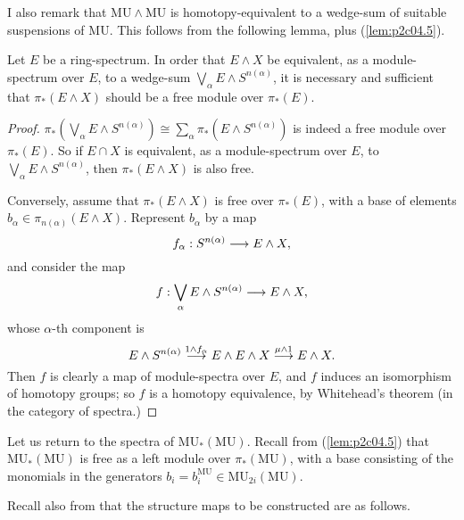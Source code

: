 \documentclass[../main]{subfiles}
\begin{document}
I also remark that $\mathrm{MU} \wedge \mathrm{MU}$ is homotopy-equivalent to a wedge-sum of suitable suspensions of $\mathrm{MU}$. This follows from the following lemma, plus (\ref{lem:p2c04.5}).
\begin{lemma}
\label{lem:p2c11.1}
Let $E$ be a ring-spectrum. In order that $E \wedge X$ be equivalent, as a module-spectrum over $E$, to a wedge-sum $\displaystyle \bigvee_\alpha E \wedge S^{n(\alpha)}$, it is necessary and sufficient that $\pi_\ast(E \wedge X)$ should be a free module over $\pi_\ast(E)$.
\end{lemma}

\begin{proof}
$\displaystyle \pi_\ast \left(\bigvee_\alpha E \wedge S^{n(\alpha)}\right) \cong \sum_\alpha \pi_\ast(E \wedge S^{n(\alpha)})$ is indeed a free module over $\pi_\ast(E)$. So if $E \cap X$ is equivalent, as a module-spectrum over $E$, to $\displaystyle \bigvee_\alpha E \wedge S^{n(\alpha)}$, then $\pi_\ast(E \wedge X)$ is also free.

Conversely, assume that $\pi_\ast(E \wedge X)$ is free over $\pi_\ast(E)$, with a base of elements $b_\alpha \in \pi_{n(\alpha)} (E \wedge X)$. Represent $b_\alpha$ by a map $$f_\alpha : S^{n(\alpha)} \overset{}{\longrightarrow} E \wedge X,$$ and consider the map $$\displaystyle f : \bigvee_\alpha E \wedge S^{n(\alpha)} \overset{}{\longrightarrow} E \wedge X,$$ whose $\alpha$-th component is $$E \wedge S^{n(\alpha)} \overset{1 \wedge f_\alpha}{\longrightarrow} E \wedge E \wedge X \overset{\mu \wedge 1}{\longrightarrow} E \wedge X.$$ Then $f$ is clearly a map of module-spectra over $E$, and $f$ induces an isomorphism of homotopy groups; so $f$ is a homotopy equivalence, by Whitehead's theorem (in the category of spectra.) 
\end{proof}

Let us return to the spectra of $\mathrm{MU}_\ast(\mathrm{MU})$. Recall from (\ref{lem:p2c04.5}) that $\mathrm{MU}_\ast(\mathrm{MU})$ is free as a left module over $\pi_\ast(\mathrm{MU})$, with a base consisting of the monomials in the generators $b_i = b_i^{\mathrm{MU}} \in \mathrm{MU}_{2i}(\mathrm{MU})$.

Recall also from \cite[p.~61]{adams3} that the structure maps to be constructed are as follows. 
\end{document}
